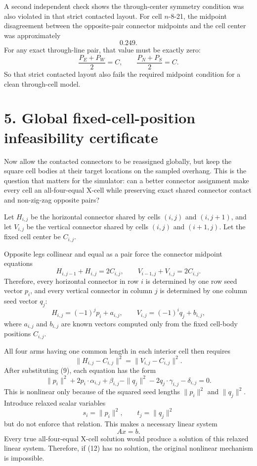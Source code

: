 \documentclass[11pt,letterpaper]{article}
\begin{document}
A second independent check shows the through-center symmetry condition was also violated in that strict contacted layout. For cell \(n\)-8-21, the midpoint disagreement between the opposite-pair connector midpoints and the cell center was approximately
\[
0.249.
\]
For any exact through-line pair, that value must be exactly zero:
\[
\frac{P_E+P_W}{2}=C,\qquad \frac{P_N+P_S}{2}=C.
\]
So that strict contacted layout also fails the required midpoint condition for a clean through-cell model.

\section*{5. Global fixed-cell-position infeasibility certificate}

Now allow the contacted connectors to be reassigned globally, but keep the square cell bodies at their target locations on the sampled overhang. This is the question that matters for the simulator: can a better connector assignment make every cell an all-four-equal X-cell while preserving exact shared connector contact and non-zig-zag opposite pairs?

Let \(H_{i,j}\) be the horizontal connector shared by cells \((i,j)\) and \((i,j+1)\), and let \(V_{i,j}\) be the vertical connector shared by cells \((i,j)\) and \((i+1,j)\). Let the fixed cell center be \(C_{i,j}\).

Opposite legs collinear and equal as a pair force the connector midpoint equations
\[
H_{i,j-1}+H_{i,j}=2C_{i,j},\qquad
V_{i-1,j}+V_{i,j}=2C_{i,j}.
\tag{8}
\]
Therefore, every horizontal connector in row \(i\) is determined by one row seed vector \(p_i\), and every vertical connector in column \(j\) is determined by one column seed vector \(q_j\):
\[
H_{i,j}=(-1)^j p_i + a_{i,j},\qquad
V_{i,j}=(-1)^i q_j + b_{i,j},
\tag{9}
\]
where \(a_{i,j}\) and \(b_{i,j}\) are known vectors computed only from the fixed cell-body positions \(C_{i,j}\).

All four arms having one common length in each interior cell then requires
\[
\|H_{i,j}-C_{i,j}\|^2=\|V_{i,j}-C_{i,j}\|^2.
\tag{10}
\]
After substituting (9), each equation has the form
\[
\|p_i\|^2 + 2p_i\cdot \alpha_{i,j} + \beta_{i,j}
-\|q_j\|^2 - 2q_j\cdot \gamma_{i,j} - \delta_{i,j}=0.
\tag{11}
\]
This is nonlinear only because of the squared seed lengths \(\|p_i\|^2\) and \(\|q_j\|^2\). Introduce relaxed scalar variables
\[
s_i=\|p_i\|^2,\qquad t_j=\|q_j\|^2
\]
but do not enforce that relation. This makes a necessary linear system
\[
Ax=b.
\tag{12}
\]
Every true all-four-equal X-cell solution would produce a solution of this relaxed linear system. Therefore, if (12) has no solution, the original nonlinear mechanism is impossible.
\end{document}
